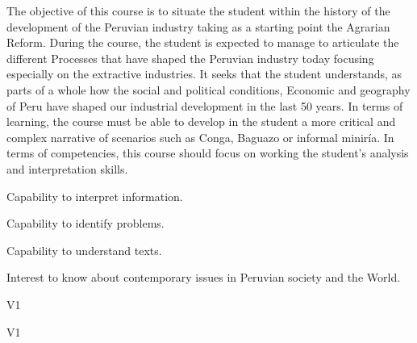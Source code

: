 \begin{syllabus}


\begin{justification}
The objective of this course is to situate the student within the history of the development of the Peruvian industry taking as a starting point the Agrarian Reform. During the course, the student is expected to manage to articulate the different
Processes that have shaped the Peruvian industry today focusing especially on the extractive industries. It seeks that the student understands, as parts of a whole how the social and political conditions,
Economic and geography of Peru have shaped our industrial development in the last 50 years. In terms of learning, the course must be able to develop in the student a more critical and complex narrative of scenarios such as Conga, Baguazo or informal miniría. In terms of competencies, this course should focus on working the student's analysis and interpretation skills.
\end{justification}

\begin{goals}
\item Capability to interpret information.
\item Capability to identify problems.
\item Capability to understand texts.
\item Interest to know about contemporary issues in Peruvian society and the World.
\end{goals}

\begin{outcomes}{V1}
    \item {} 
    \item {} 
    \item {} 
    \item {} 
    \item {} 
\end{outcomes}

\begin{competences}{V1}
    \item {}
    \item {}
    \item {}
    \item {}
\end{competences}


\end{syllabus}

